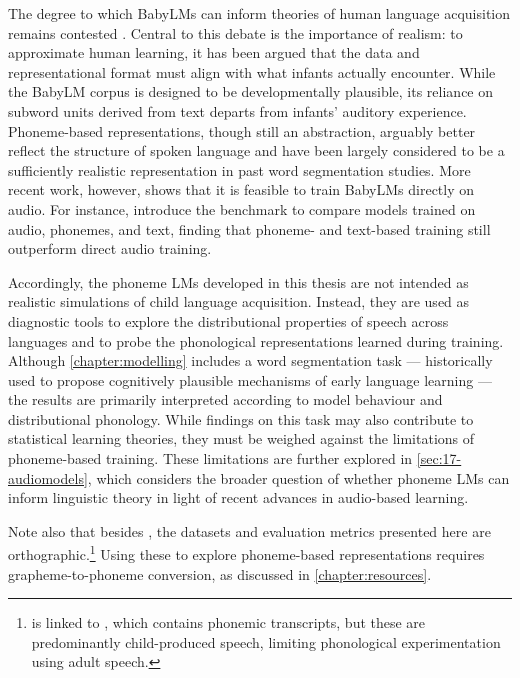 The degree to which BabyLMs can inform theories of human language acquisition remains contested \citep{dupoux-2018-cognitive,baroni-2022-proper,warstadt-2022-artificial,seyssel-2023-realistic,beinborn2024cognitive,wilcox2025bigger,salhancopil2025}. Central to this debate is the importance of realism: to approximate human learning, it has been argued that the data and representational format must align with what infants actually encounter. While the BabyLM corpus is designed to be developmentally plausible, its reliance on subword units derived from text departs from infants' auditory experience. Phoneme-based representations, though still an abstraction, arguably better reflect the structure of spoken language and have been largely considered to be a sufficiently realistic representation in past word segmentation studies. More recent work, however, shows that it is feasible to train BabyLMs directly on audio. For instance, \citet{lavechin} introduce the \babyslm benchmark to compare models trained on audio, phonemes, and text, finding that phoneme- and text-based training still outperform direct audio training. %


Accordingly, the phoneme LMs developed in this thesis are not intended as realistic simulations of child language acquisition. Instead, they are used as diagnostic tools to explore the distributional properties of speech across languages and to probe the phonological representations learned during training. Although \cref{chapter:modelling} includes a word segmentation task --- historically used to propose cognitively plausible mechanisms of early language learning --- the results are primarily interpreted according to model behaviour and distributional phonology. While findings on this task may also contribute to statistical learning theories, they must be weighed against the limitations of phoneme-based training. These limitations are further explored in \cref{sec:17-audiomodels}, which considers the broader question of whether phoneme LMs can inform linguistic theory in light of recent advances in audio-based learning.

Note also that besides \babyslm, the datasets and evaluation metrics presented here are orthographic.\footnote{\childes is linked to , which contains phonemic transcripts, but these are predominantly child-produced speech, limiting phonological experimentation using adult speech.} Using these to explore phoneme-based representations requires grapheme-to-phoneme conversion, as discussed in \cref{chapter:resources}. 

